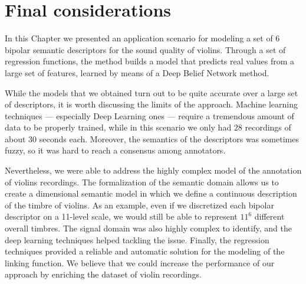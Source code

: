 


%
%

\section{Final considerations}\label{sec:Violin:conclusion}
In this Chapter we presented an application scenario for modeling a set of 6 bipolar semantic descriptors for the sound quality of violins. Through a set of regression functions, the method builds a model that predicts real values from a large set of features, learned by means of a Deep Belief Network method.

While the models that we obtained turn out to be quite accurate over a large set of descriptors, it is worth discussing the limits of the approach. Machine learning techniques --- especially Deep Learning ones --- require a tremendous amount of data to be properly trained, while in this scenario we only had $28$ recordings of about $30$ seconds each. Moreover, the semantics of the descriptors was sometimes fuzzy, so it was hard to reach a consensus among annotators. 

Nevertheless, we were able to address the highly complex model of the annotation of violins recordings. The formalization of the semantic domain allows us to create a dimensional semantic model in which we define a continuous description of the timbre of violins. As an example, even if we discretized each bipolar descriptor on a 11-level scale, we would still be able to represent $11^6$ different overall timbres. The signal domain was also highly complex to identify, and the deep learning techniques helped tackling the issue. Finally, the regression techniques provided a reliable and automatic solution for the modeling of the linking function. We believe that we could increase the performance of our approach by enriching the dataset of violin recordings.



